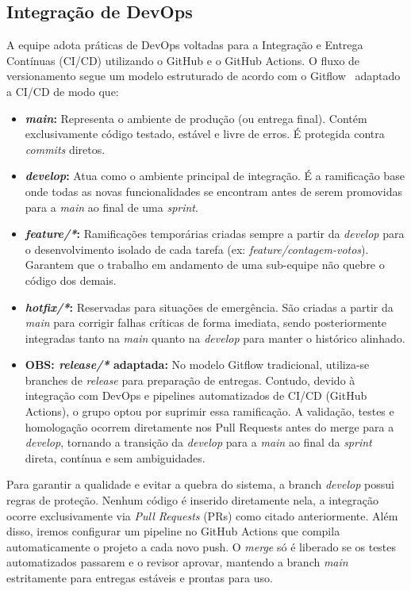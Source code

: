 \documentclass[12pt,a4paper]{article}
\begin{document}
\subsection{Integração de DevOps}
A equipe adota práticas de DevOps voltadas para a Integração e Entrega Contínuas (CI/CD) utilizando o GitHub e o GitHub Actions. O fluxo de versionamento segue um modelo estruturado de acordo com o Gitflow~\cite{driessen2010gitbranching} adaptado a CI/CD de modo que: 

\begin{itemize}
    \item \textbf{\textit{main}:} Representa o ambiente de produção (ou entrega final). Contém exclusivamente código testado, estável e livre de erros. É protegida contra \textit{commits} diretos.
    
    \item \textbf{\textit{develop}:} Atua como o ambiente principal de integração. É a ramificação base onde todas as novas funcionalidades se encontram antes de serem promovidas para a \textit{main} ao final de uma \textit{sprint}.
    
    \item \textbf{\textit{feature/*}:} Ramificações temporárias criadas sempre a partir da \textit{develop} para o desenvolvimento isolado de cada tarefa (ex: \textit{feature/contagem-votos}). Garantem que o trabalho em andamento de uma sub-equipe não quebre o código dos demais. 
    
    \item \textbf{\textit{hotfix/*}:} Reservadas para situações de emergência. São criadas a partir da \textit{main} para corrigir falhas críticas de forma imediata, sendo posteriormente integradas tanto na \textit{main} quanto na \textit{develop} para manter o histórico alinhado.
    
    \item \textbf{OBS: \textit{release/*} adaptada:} No modelo Gitflow tradicional, utiliza-se branches de \textit{release} para preparação de entregas. Contudo, devido à integração com DevOps e pipelines automatizados de CI/CD (GitHub Actions), o grupo optou por suprimir essa ramificação. A validação, testes e homologação ocorrem diretamente nos Pull Requests antes do merge para a \textit{develop}, tornando a transição da \textit{develop} para a \textit{main} ao final da \textit{sprint} direta, contínua e sem ambiguidades.
\end{itemize}

Para garantir a qualidade e evitar a quebra do sistema, a branch \textit{develop} possui regras de proteção. Nenhum código é inserido diretamente nela, a integração ocorre exclusivamente via \textit{Pull Requests} (PRs) como citado anteriormente. Além disso, iremos configurar um pipeline no GitHub Actions que compila automaticamente o projeto a cada novo push. O \textit{merge} só é liberado se os testes automatizados passarem e o revisor aprovar, mantendo a branch \textit{main} estritamente para entregas estáveis e prontas para uso.
\end{document}
